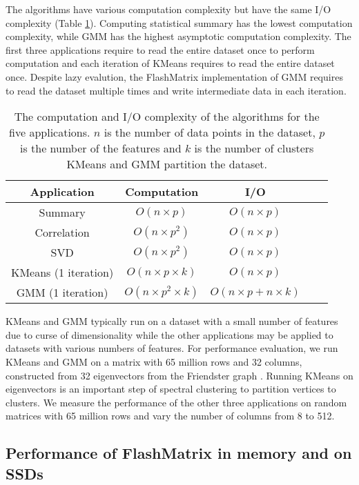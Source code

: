 The algorithms have various computation complexity but have the same I/O
complexity (Table \ref{tbl:algs}). Computing statistical summary
has the lowest computation complexity, while GMM has the highest asymptotic
computation complexity. The first three applications require to read the entire
dataset once to perform computation and each iteration of KMeans requires to
read the entire dataset once. Despite lazy evalution, the FlashMatrix
implementation of GMM requires to read the dataset multiple times and write
intermediate data in each iteration.

\begin{table}
\begin{center}
\footnotesize
\begin{tabular}{|c|c|c|c|c|}
\hline
Application & Computation & I/O \\
\hline
Summary & $O(n \times p)$ & $O(n \times p)$ \\
\hline
Correlation & $O(n \times p^2)$ & $O(n \times p)$ \\
\hline
SVD & $O(n \times p^2)$ & $O(n \times p)$ \\
\hline
KMeans (1 iteration) & $O(n \times p \times k)$ & $O(n \times p)$ \\
\hline
GMM (1 iteration) & $O(n \times p^2 \times k)$ & $O(n \times p + n \times k)$ \\
\hline
\end{tabular}
\normalsize
\end{center}
\caption{The computation and I/O complexity of the algorithms for the five
	applications. $n$ is the number of data points in the dataset, $p$ is
	the number of the features and $k$ is the number of clusters KMeans and
GMM partition the dataset.}
\label{tbl:algs}
\end{table}

KMeans and GMM typically run on a dataset with a small number of features
due to curse of dimensionality while the other applications may be applied
to datasets with various numbers
of features. For performance evaluation, we run KMeans and GMM on a matrix
with 65 million rows and 32 columns, constructed from 32 eigenvectors from
the Friendster graph \cite{friendster}. Running KMeans on eigenvectors is
an important step of spectral clustering \cite{Luxburg07} to partition vertices
to clusters. We measure the performance of the other three applications on
random matrices with 65 million rows and vary the number of columns from 8
to 512.

\subsection{Performance of FlashMatrix in memory and on SSDs}


